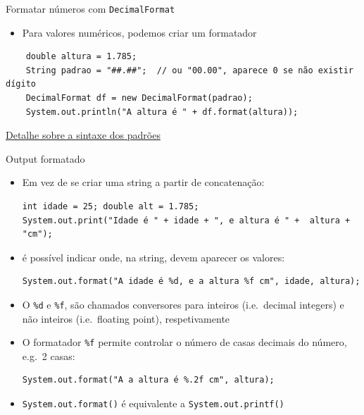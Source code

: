 \documentclass[portuguese, aspectratio=169, xcolor=table]{beamer}
\begin{document}
\begin{frame}[fragile]{Formatar números com \texttt{DecimalFormat}}
\begin{itemize}
    \item Para valores numéricos, podemos criar um formatador
\end{itemize}
\vspace{0.5cm}
\begin{verbatim}
    double altura = 1.785;
    String padrao = "##.##";  // ou "00.00", aparece 0 se não existir dígito
    DecimalFormat df = new DecimalFormat(padrao);
    System.out.println("A altura é " + df.format(altura));
\end{verbatim}
\vfill

\begin{center}
    \href{https://docs.oracle.com/javase/tutorial/i18n/format/decimalFormat.html#numberpattern}{Detalhe sobre a sintaxe dos padrões}
\end{center}
\end{frame}


\begin{frame}[fragile]{Output formatado}
\begin{itemize}
    \item Em vez de se criar uma string a partir de concatenação:
\begin{verbatim}
int idade = 25; double alt = 1.785;
System.out.print("Idade é " + idade + ", e altura é " +  altura + "cm");
\end{verbatim}
\item é possível indicar onde, na string, devem aparecer os valores:
\begin{verbatim}
System.out.format("A idade é %d, e a altura %f cm", idade, altura);
\end{verbatim}
        
\item O \texttt{\%d} e \texttt{\%f}, são chamados conversores para inteiros (i.e.\ decimal integers) e não inteiros (i.e.\ floating point), respetivamente

\item O formatador \texttt{\%f} permite controlar o número de casas decimais do número, e.g.\ 2 casas:
\begin{verbatim}
System.out.format("A a altura é %.2f cm", altura);
\end{verbatim}

\item \texttt{System.out.format()} é equivalente a \texttt{System.out.printf()}
\end{itemize}
\end{frame}
\end{document}
